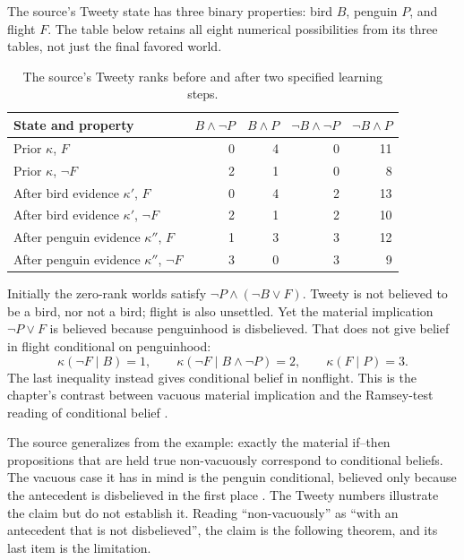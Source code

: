 The source's Tweety state has three binary properties: bird \(B\), penguin
\(P\), and flight \(F\).  The table below retains all eight numerical
possibilities from its three tables, not just the final favored world.
\begin{table}[htbp]
\centering\small
\begin{tabular}{@{}lrrrr@{}}
\toprule
State and property & \(B\land\neg P\) & \(B\land P\) &
 \(\neg B\land\neg P\) & \(\neg B\land P\)\\
\midrule
Prior \(\kappa\), \(F\) &0&4&0&11\\
Prior \(\kappa\), \(\neg F\)&2&1&0&8\\
After bird evidence \(\kappa'\), \(F\)&0&4&2&13\\
After bird evidence \(\kappa'\), \(\neg F\)&2&1&2&10\\
After penguin evidence \(\kappa''\), \(F\)&1&3&3&12\\
After penguin evidence \(\kappa''\), \(\neg F\)&3&0&3&9\\
\bottomrule
\end{tabular}
\caption{The source's Tweety ranks before and after two specified learning steps.}
\label{tab:p15-rat53-tweety}
\end{table}

Initially the zero-rank worlds satisfy
\(\neg P\land(\neg B\lor F)\).  Tweety is not believed to be a bird,
nor not a bird; flight is also unsettled.  Yet the material implication
\(\neg P\lor F\) is believed because penguinhood is disbelieved.
That does not give belief in flight conditional on penguinhood:
\[
 \kappa(\neg F\mid B)=1,\qquad
 \kappa(\neg F\mid B\land\neg P)=2,\qquad
 \kappa(F\mid P)=3.
\]
The last inequality instead gives conditional belief in nonflight.
This is the chapter's contrast between vacuous material implication and the
Ramsey-test reading of conditional belief
\parencite[Tables~5.3.1--5.3.3, pp.~338--340]{KernIsbernerSkovgaardOlsenSpohn2021Ranking}.

The source generalizes from the example: exactly the material if--then
propositions that are held true non-vacuously correspond to conditional
beliefs.  The vacuous case it has in mind is the penguin conditional, believed
only because the antecedent is disbelieved in the first place
\parencite[pp.~338--339]{KernIsbernerSkovgaardOlsenSpohn2021Ranking}.
The Tweety numbers illustrate the claim but do not establish it.  Reading
``non-vacuously'' as ``with an antecedent that is not disbelieved'', the
claim is the following theorem, and its last item is the limitation.


